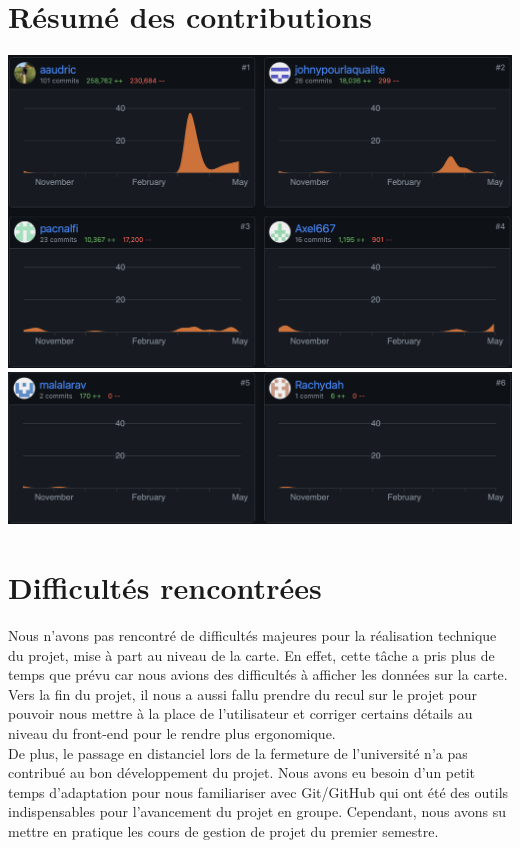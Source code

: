 \documentclass[12pt,a4paper]{report}
\begin{document}
\section{Résumé des contributions}
\vspace{0.5cm}
 \begin{center}
        \includegraphics[width=1\textwidth]{images/contribution1.png}
        \includegraphics[width=1\textwidth]{images/contribution2.png}
\end{center}

\section{Difficultés rencontrées}
Nous n'avons pas rencontré de difficultés majeures pour la réalisation technique du projet, mise à part au niveau de la carte. En effet, cette tâche a pris plus de temps que prévu car nous avions des difficultés à afficher les données sur la carte. \\

Vers la fin du projet, il nous a aussi fallu prendre du recul sur le projet pour pouvoir nous mettre à la place de l'utilisateur et corriger certains détails au niveau du front-end pour le rendre plus ergonomique. \\

De plus, le passage en distanciel lors de la fermeture de l'université n'a pas contribué au bon développement du projet. Nous avons eu besoin d'un petit temps d'adaptation pour nous familiariser avec Git/GitHub qui ont été des outils indispensables pour l'avancement du projet en groupe. Cependant, nous avons su mettre en pratique les cours de gestion de projet du premier semestre. 
\end{document}
